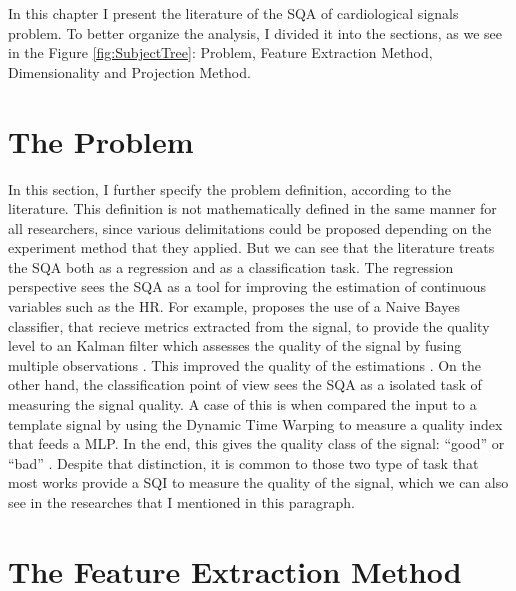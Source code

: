 

In this chapter I present the literature of the \acrlong{SQA} of cardiological signals problem. To better organize the analysis, I divided it into the sections, as we see in the Figure \ref{fig:SubjectTree}: Problem, Feature Extraction Method, Dimensionality and Projection Method.



\section{The Problem}


In this section, I further specify the problem definition, according to the literature. This definition is not mathematically defined in the same manner for all researchers, since various delimitations could be proposed depending on the experiment method that they applied. But we can see that the literature treats the \acrshort{SQA} both as a regression and as a classification task. The regression perspective sees the \acrshort{SQA} as a tool for improving the estimation of continuous variables such as the \acrlong{HR}. For example, \citeauthor{review-1} proposes the use of a Naive Bayes classifier, that recieve metrics extracted from the signal, to provide the quality level to an Kalman filter which assesses the quality of the signal by fusing multiple observations \cite{review-1}. This improved the quality of the estimations \cite{review-1}. On the other hand, the classification point of view sees the \acrshort{SQA} as a isolated task of measuring the signal quality. A case of this is when \citeauthor{review-2} compared the input to a template signal by using the Dynamic Time Warping to measure a quality index that feeds a \acrshort{MLP}. In the end, this gives the quality class of the signal: ``good'' or ``bad'' \cite{review-2}. Despite that distinction, it is common to those two type of task that most works provide a \acrfull{SQI} to measure the quality of the signal, which we can also see in the researches that I mentioned in this paragraph.  

\section{The Feature Extraction Method}

